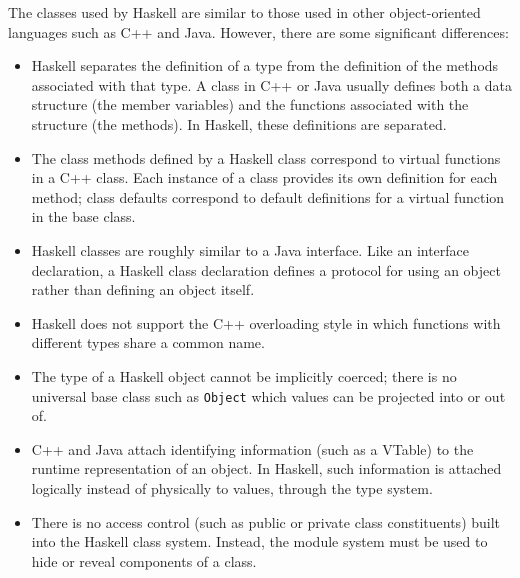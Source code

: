 The classes used by Haskell are similar to those used in other
object-oriented languages such as C++ and Java.  However, there are
some significant differences:
\begin{itemize}
\item Haskell separates the definition of a type from the definition
of the methods associated with that type.  A class in C++ or Java
usually defines both a data structure (the member variables) and the
functions associated with the structure (the methods).  In Haskell,
these definitions are separated.
\item The class methods defined by a Haskell class correspond to
virtual functions in a C++ class.  Each instance of a class provides
its own definition for each method; class defaults correspond to
default definitions for a virtual function in the base class. 
\item Haskell classes are roughly similar to a Java interface.  Like
an interface declaration, a Haskell class declaration defines a
protocol for using an object rather than defining an object itself.
\item Haskell does not support the C++ overloading style in which
functions with different types share a common name. 
\item The type of a Haskell object cannot be implicitly coerced; there
is no universal base class such as \mbox{\tt Object} which values can be
projected into or out of.
\item C++ and Java attach identifying information (such as a VTable)
to the runtime representation of an object.  In Haskell, such
information is attached logically instead of physically to values,
through the type system.
\item There is no access control (such as public or private class
constituents) built into the Haskell class system. Instead, the module
system must be used to hide or reveal components of a class.
\end{itemize}


